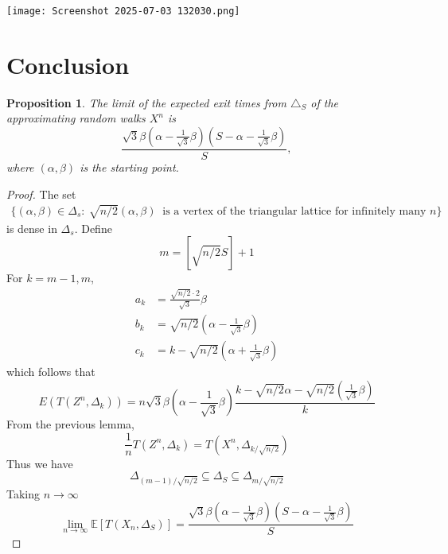 \documentclass[a0,portrait]{a0poster}
\newtheorem{proposition}[theorem]{Proposition}
\begin{document}
\begin{mdframed}[style=MyFrame]
\begin{multicols}{2}
\begin{minipage}{\columnwidth}
\end{minipage}
\vspace{1cm} %

\begin{minipage}{\columnwidth}
    \texttt{[image: Screenshot 2025-07-03 132030.png]}
\end{minipage}

\section{Conclusion}
\begin{proposition}\cite{MR2023644}
The limit of the expected exit times from $\triangle_S$ of the approximating random walks $X^n$ is
\[
\frac{ \sqrt{3}\beta \left( \alpha - \frac{1}{\sqrt{3}}\beta \right) \left( S - \alpha - \frac{1}{\sqrt{3}}\beta \right) }{S}, \tag{14}
\]
where $(\alpha, \beta)$ is the starting point.
\end{proposition}
\begin{proof}
The set
\begin{align*}
\big\{(\alpha, \beta) \in \Delta_s :\ 
\sqrt{n/2}(\alpha, \beta)\ 
\text{ is a vertex of the triangular lattice for infinitely many } n\big\}
\end{align*}
is dense in $\Delta_s$. Define
\[
m =[\sqrt{n/2}S] + 1
\]
For $k = m - 1, m$,
\begin{align*}
a_k &= \frac{\sqrt{n/2} \cdot 2}{\sqrt{3}} \beta\\
b_k &= {\sqrt{n/2}}\left( \alpha - \frac{1}{\sqrt{3}} \beta \right)\\
c_k &= k - \sqrt{n/2} \left( \alpha + \frac{1}{\sqrt{3}} \beta \right)
\end{align*}
which follows that
\[
E\left( T(Z^n, \Delta_k) \right) = n \sqrt{3} \beta \left( \alpha - \frac{1}{\sqrt{3}} \beta \right)
\frac{k - \sqrt{n/2} \alpha - \sqrt{n/2} \left( \frac{1}{\sqrt{3}} \beta \right)}{k}
\]
From the previous lemma,
\[
\frac{1}{n} T\left(Z^n, \Delta_k\right) = T\left(X^n ,\Delta_{k/\sqrt{n/2}} \right)
\]
Thus we have
\[
\Delta_{(m-1)/\sqrt{n/2}} \subseteq \Delta_S \subseteq \Delta_{m/\sqrt{n/2}}
\]
Taking $n \to \infty$
\[
\lim_{n \to \infty} \mathbb{E}[T(X_n, \Delta_{S})] = 
\frac{ \sqrt{3}\beta\left(\alpha - \frac{1}{\sqrt{3}}\beta\right)\left(S - \alpha - \frac{1}{\sqrt{3}}\beta\right) }{S}
\]
\end{proof}
%


\end{multicols}
\end{mdframed}
\end{document}
